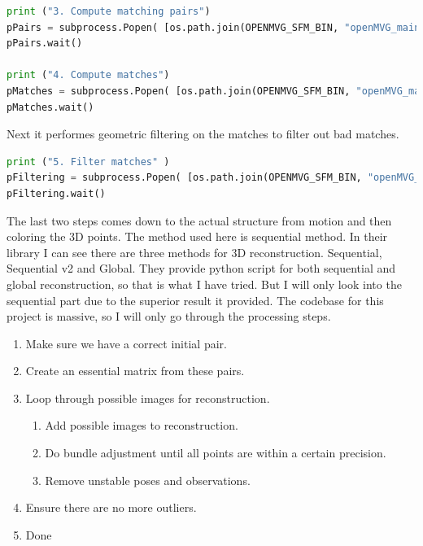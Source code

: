 \documentclass{article}
\begin{document}
    \begin{lstlisting}[language=python]
print ("3. Compute matching pairs")
pPairs = subprocess.Popen( [os.path.join(OPENMVG_SFM_BIN, "openMVG_main_PairGenerator"), "-i", matches_dir+"/sfm_data.json", "-o" , matches_dir + "/pairs.bin" ] )
pPairs.wait()

print ("4. Compute matches")
pMatches = subprocess.Popen( [os.path.join(OPENMVG_SFM_BIN, "openMVG_main_ComputeMatches"),  "-i", matches_dir+"/sfm_data.json", "-p", matches_dir+ "/pairs.bin", "-o", matches_dir + "/matches.putative.bin" ] )
pMatches.wait()
    \end{lstlisting}
    Next it performes geometric filtering on the matches to filter out bad matches.

    \begin{lstlisting}[language=python]
print ("5. Filter matches" )
pFiltering = subprocess.Popen( [os.path.join(OPENMVG_SFM_BIN, "openMVG_main_GeometricFilter"), "-i", matches_dir+"/sfm_data.json", "-m", matches_dir+"/matches.putative.bin" , "-g" , "f" , "-o" , matches_dir+"/matches.f.bin" ] )
pFiltering.wait()
    \end{lstlisting}
    The last two steps comes down to the actual structure from motion and then coloring the 3D points. The method used here is sequential method. In their library I can see there are three methods for 3D reconstruction. Sequential, Sequential v2 and Global. They provide python script for both sequential and global reconstruction, so that is what I have tried. But I will only look into the sequential part due to the superior result it provided. The codebase for this project is massive, so I will only go through the processing steps.
    \begin{enumerate}
        \item Make sure we have a correct initial pair.
        \item Create an essential matrix from these pairs.
        \item Loop through possible images for reconstruction.
        \begin{enumerate}
            \item Add possible images to reconstruction.
            \item Do bundle adjustment until all points are within a certain precision.
            \item Remove unstable poses and observations.
        \end{enumerate}
        \item Ensure there are no more outliers.
        \item Done
    \end{enumerate}
\end{document}
